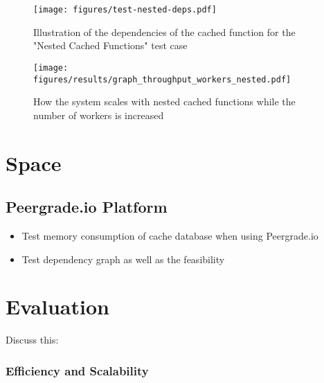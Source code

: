 \begin{figure*}[ht!]
  \centering
  \texttt{[image: figures/test-nested-deps.pdf]}
  \caption{Illustration of the dependencies of the cached function for the "Nested Cached Functions" test case}
  \label{fig:test-nested-deps}
\end{figure*}

\begin{figure*}[ht!]
  \centering
  \texttt{[image: figures/results/graph\_throughput\_workers\_nested.pdf]}
  \caption{How the system scales with nested cached functions while the number of workers is increased}
  \label{fig:graph_throughput_workers_nested}
\end{figure*}



\section{Space}
\label{sec:space}

\subsection{Peergrade.io Platform}
\label{subsec:peergrade-io-platform}

\begin{itemize}
  \item Test memory consumption of cache database when using Peergrade.io
  \item Test dependency graph as well as the feasibility
\end{itemize}



\section{Evaluation}
\label{sec:evaluation}


Discuss this:

\subsubsection{Efficiency and Scalability}
\label{subsubsec:efficiency-and-scalability}

